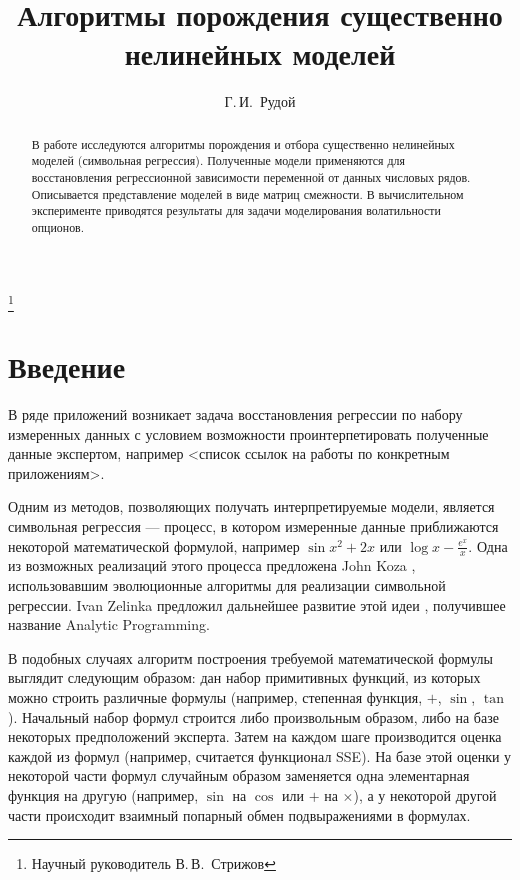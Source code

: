 \documentclass[12pt,a4paper]{amsart}
\begin{document}
\pagestyle{plain}

\title{Алгоритмы порождения существенно нелинейных моделей}
\author{Г.\,И.~Рудой}
\address{Московский физико-технический институт, ФУПМ, каф. <<Интеллектуальные системы>>}
\thanks{Научный руководитель В.\,В.~Стрижов}

\begin{abstract}
  В работе исследуются алгоритмы порождения и отбора существенно нелинейных моделей (символьная регрессия). Полученные модели применяются для восстановления регрессионной зависимости переменной от данных числовых рядов. Описывается представление моделей в виде матриц смежности. В вычислительном эксперименте приводятся результаты для задачи моделирования волатильности опционов.
\end{abstract}

\maketitle

\section{Введение}

В ряде приложений возникает задача восстановления регрессии по набору
измеренных данных с условием возможности проинтерпетировать полученные данные
экспертом, например <список ссылок на работы по конкретным приложениям>.

Одним из методов, позволяющих получать интерпретируемые модели, является
символьная регрессия --- процесс, в котором измеренные данные приближаются
некоторой математической формулой, например $ \sin x^2 + 2x $ или
$\log x - \frac{e^x}{x} $. Одна из возможных реализаций этого процесса
предложена John Koza \cite{Koza1998GP} \cite{Koza1998Intro}, использовавшим
эволюционные алгоритмы для реализации символьной регрессии. Ivan Zelinka
предложил дальнейшее развитие этой идеи \cite{Zelinka2008}, получившее
название Analytic Programming.

В подобных случаях алгоритм построения требуемой математической формулы
выглядит следующим образом: дан набор примитивных функций, из которых можно
строить различные формулы (например, степенная функция, $+$, $\sin$, $\tan$).
Начальный набор формул строится либо произвольным образом, либо на базе
некоторых предположений эксперта. Затем на каждом шаге производится оценка
каждой из формул (например, считается функционал SSE). На базе этой оценки
у некоторой части формул случайным образом заменяется одна элементарная функция на другую (например, $\sin$ на $\cos$ или $+$ на $\times$), а у некоторой
другой части происходит взаимный попарный обмен подвыражениями в формулах.
\end{document}
